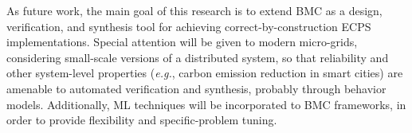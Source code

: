 \documentclass[format=acmsmall, review=false, screen=true]{acmart}
\begin{document}
{{As future work, the main goal of this research is to extend BMC as a design, verification, and synthesis tool for achieving correct-by-construction ECPS implementations. Special attention will be given to modern micro-grids, considering small-scale versions of a distributed system, so that reliability and other system-level properties ({\it e.g.}, carbon emission reduction in smart cities) are amenable to automated verification and synthesis, probably through behavior models. Additionally, ML techniques will be incorporated to BMC frameworks, in order to provide flexibility and specific-problem tuning.











\begin{thebibliography}{1}


\end{thebibliography}}}
\end{document}
